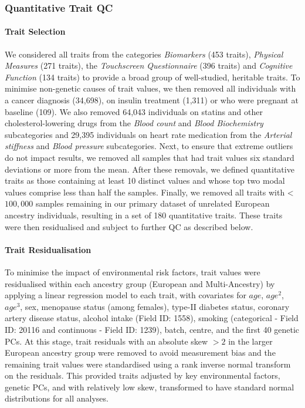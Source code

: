 \documentclass[12pt]{zHenriquesLab-StyleBioRxiv}
\begin{document}
\subsubsection*{Quantitative Trait QC} \label{sec:methods:traitQC} 
\paragraph*{Trait Selection} 
We considered all traits from the categories \textit{Biomarkers} (453 traits), 
\textit{Physical Measures} (271 traits), the \textit{Touchscreen Questionnaire} (396 traits) 
and \textit{Cognitive Function} (134 traits) to provide a broad group of well-studied, heritable traits. 
To minimise non-genetic causes of trait values, we then removed all individuals with a cancer diagnosis (34,698), 
on insulin treatment (1,311) or who were pregnant at baseline (109). We also removed 64,043 individuals 
on statins and other cholesterol-lowering drugs from the \textit{Blood count} 
and \textit{Blood Biochemistry} subcategories and 29,395 individuals
on heart rate medication from the \textit{Arterial stiffness} and \textit{Blood pressure} subcategories.
Next, to ensure that extreme outliers do not impact results, we removed all samples that had 
trait values six standard deviations or more from the mean. After these removals, we defined quantitative traits as 
those containing at least 10 distinct values and whose top two modal values comprise less than 
half the samples. Finally, we removed all traits with < $100,000$ samples remaining in our 
primary dataset of unrelated European ancestry individuals, resulting in a set of 180 quantitative 
traits. These traits were then residualised and subject to further QC as described below. 
%
\paragraph*{Trait Residualisation}
To minimise the impact of environmental risk factors, trait values were 
residualised within each ancestry group (European and Multi-Ancestry) by applying a linear regression 
model to each trait, with covariates for $age$, $age^2$, $age^3$, sex, menopause status (among females), %
type-II diabetes status, coronary artery disease status, alcohol intake (Field ID: 1558), 
smoking (categorical - Field ID: 20116 and continuous - Field ID: 1239), 
batch, centre, and the first 40 genetic PCs.  
At this stage, trait residuals with an absolute skew $>2$ \cite{skew_book} 
in the larger European ancestry group were removed to avoid measurement bias and 
the remaining trait values were standardised using a rank inverse 
normal transform on the residuals. This provided traits adjusted by key environmental factors, genetic 
PCs, and with relatively low skew, transformed to have standard normal distributions for all analyses. 
%
\end{document}
